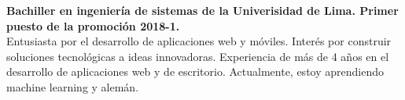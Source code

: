 

\begin{cvparagraph}

{\bfseries Bachiller en ingeniería de sistemas de la Univerisidad de Lima. Primer puesto de la promoción 2018-1.}\\
Entusiasta por el desarrollo de aplicaciones web y móviles. Interés por construir soluciones tecnológicas a ideas innovadoras. Experiencia de más de 4 años en el desarrollo de aplicaciones web y de escritorio. Actualmente, estoy aprendiendo machine learning y alemán.
\end{cvparagraph}
